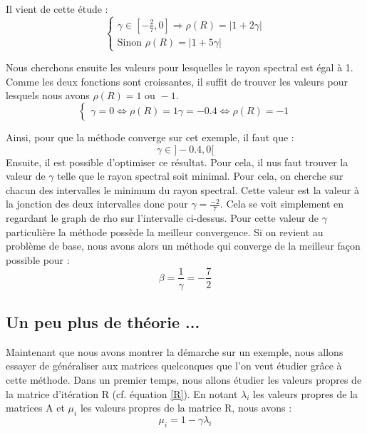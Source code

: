 Il vient de cette étude : 
\begin{equation}
\begin{cases}
\gamma \in [- \frac{2}{7}, 0] \Rightarrow \rho(R) = |1 + 2\gamma|\\
\text{Sinon } \rho(R) = |1 + 5\gamma|
\end{cases} 
\end{equation}

Nous cherchons ensuite les valeurs pour lesquelles le rayon spectral est égal à 1. Comme les deux fonctions sont croissantes, il suffit de trouver les valeurs pour lesquels nous avons $\rho(R) = 1 \text{ ou } -1$.
\begin{equation}
\begin{cases}
	\gamma = 0 \Leftrightarrow \rho(R) = 1
	\gamma = -0.4 \Leftrightarrow \rho(R) = -1
\end{cases}
\end{equation}

Ainsi, pour que la méthode converge sur cet exemple, il faut que : 
\begin{equation}
\gamma \in ] -0.4, 0[
\end{equation}
Ensuite, il est possible d'optimiser ce résultat. Pour cela, il nus faut trouver la valeur de $\gamma$ telle que le rayon spectral soit minimal. Pour cela, on cherche sur chacun des intervalles le minimum du rayon spectral. Cette valeur est la valeur à la jonction des deux intervalles donc pour $\gamma = \frac{-2}{7}$. Cela se voit simplement en regardant le graph de rho sur l'intervalle ci-dessus. Pour cette valeur de $\gamma$ particulière la méthode possède la meilleur convergence. Si on revient au problème de base, nous avons alors un méthode qui converge de la meilleur façon possible pour : 
\begin{equation}
\beta = \frac{1}{\gamma} = - \frac{7}{2}
\end{equation}

\subsection{Un peu plus de théorie ...}
Maintenant que nous avons montrer la démarche sur un exemple, nous allons essayer de généraliser aux matrices quelconques que l'on veut étudier grâce à cette méthode. Dans un premier temps, nous allons étudier les valeurs propres de la matrice d'itération R (cf. équation \ref{R}). En notant $\lambda_i$ les valeurs propres de la matrices A et $\mu_i$ les valeurs propres de la matrice R, nous avons : 
\begin{equation}
	\mu_i = 1 - \gamma\lambda_i
\end{equation}

